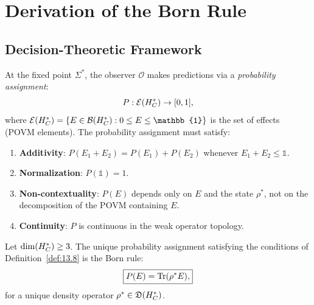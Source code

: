 \section{Derivation of the Born Rule}
\label{sec:ch13:born}

\subsection{Decision-Theoretic Framework}

\begin{definition}\label{def:13.8}
At the fixed point $\Sigma^*$, the observer $\mathcal{O}$ makes
predictions via a \emph{probability assignment}:
\begin{equation}\label{eq:prob-assign}
  P : \mathcal{E}(H_C^*) \to [0,1],
\end{equation}
where $\mathcal{E}(\HC^*) = \{E \in \mathcal{B}(\HC^*) : 0 \leq E
\leq \mathbb{1}\}$ is the set of effects (POVM elements).
The probability assignment must satisfy:
\begin{enumerate}
  \item \textbf{Additivity}: $P(E_1 + E_2) = P(E_1) + P(E_2)$
    whenever $E_1 + E_2 \leq \mathbb{1}$.
  \item \textbf{Normalization}: $P(\mathbb{1}) = 1$.
  \item \textbf{Non-contextuality}: $P(E)$ depends only on $E$ and
    the state $\rho^*$, not on the decomposition of the POVM
    containing $E$.
  \item \textbf{Continuity}: $P$ is continuous in the weak operator
    topology.
\end{enumerate}
\end{definition}

\begin{theorem}\label{thm:13.5}
Let $\dim(H_C^*) \geq 3$.  The unique probability assignment satisfying
the conditions of Definition~\ref{def:13.8} is the Born rule:
\begin{equation}\label{eq:born-rule}
  \boxed{P(E) = \mathrm{Tr}(\rho^* E),}
\end{equation}
for a unique density operator $\rho^* \in \mathfrak{D}(H_C^*)$.
\end{theorem}

